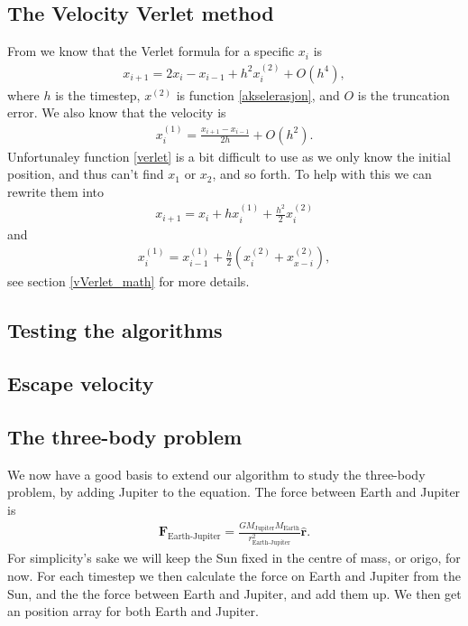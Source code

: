 \documentclass[a4paper]{article}
\begin{document}
\subsection{The Velocity Verlet method}
From \cite{lecture notes} we know that the Verlet formula for a specific $x_i$ is
\begin{align}
x_{i+1} = 2x_i - x_{i-1} + h^2 x_i^{(2)} + O(h^4) \label{verlet},
\end{align}
where $h$ is the timestep, $x^{(2)}$ is function \ref{akselerasjon}, and $O$ is the truncation error. We also know that the velocity is
\begin{align}
x_i^{(1)} = \frac{x_{i+1} - x_{i-1}}{2h} + O(h^2). \label{vVerlet}
\end{align}
Unfortunaley function \ref{verlet} is a bit difficult to use as we only know the initial position, and thus can't find $x_1$ or $x_2$, and so forth. To help with this we can rewrite them into
\begin{align}
x_{i+1} = x_i + hx_i^{(1)} + \frac{h^2}{2}x_i^{(2)} \label{velVerlet}
\end{align}
and
\begin{align}
x_i^{(1)} = x_{i-1}^{(1)} + \frac{h}{2} \left( x_i^{(2)} + x_{x-i}^{(2)} \right) \label{VvelVerlet},
\end{align}
see section \ref{vVerlet_math} for more details.

\subsection{Testing the algorithms}

\subsection{Escape velocity}

\subsection{The three-body problem}
We now have a good basis to extend our algorithm to study the three-body problem, by adding Jupiter to the equation. The force between Earth and Jupiter is
\begin{align}
\boldsymbol{F}_{\text{Earth-Jupiter}} = \frac{G M_\text{Jupiter} M_{\text{Earth}}} {r_{\text{Earth-Jupiter}}^{2}} \boldsymbol{\hat{r}}.
\end{align}
For simplicity's sake we will keep the Sun fixed in the centre of mass, or origo, for now. For each timestep we then calculate the force on Earth and Jupiter from the Sun, and the the force between Earth and Jupiter, and add them up. We then get an position array for both Earth and Jupiter.
\end{document}

